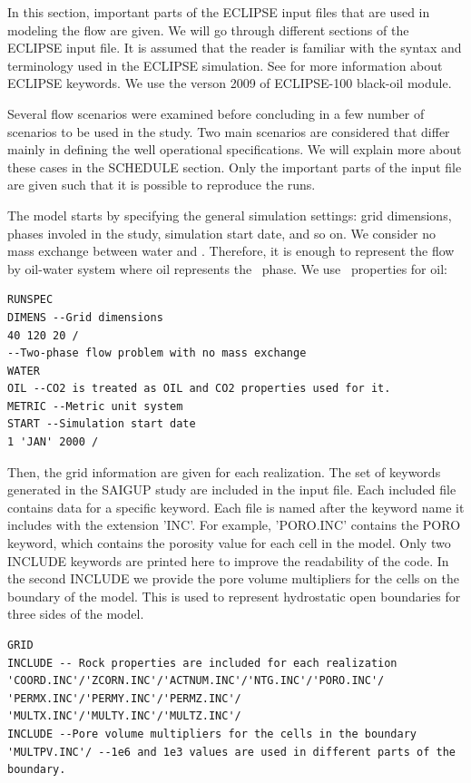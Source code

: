 In this section, important parts of the ECLIPSE input files that are used in modeling the flow are given. We will go through different sections of the ECLIPSE input file. It is assumed that the reader is familiar with the syntax and terminology used in the ECLIPSE simulation. See \cite{sis2007eclipse} for more information about ECLIPSE keywords. We use the verson 2009 of ECLIPSE-100 black-oil module.

Several flow scenarios were examined before concluding in a few number of scenarios to be used in the study. Two main scenarios are considered that differ mainly in defining the well operational specifications. We will explain more about these cases in the SCHEDULE section. Only the important parts of the input file are given such that it is possible to reproduce the runs.

The model starts by specifying the general simulation settings: grid dimensions, phases involed in the study, simulation start date, and so on. We consider no mass exchange between water and \coo. Therefore, it is enough to represent the flow by oil-water system where oil represents the \coo\ phase. We use \coo\ properties for oil:  
\begin{lstlisting}
RUNSPEC 
DIMENS --Grid dimensions
40 120 20 / 
--Two-phase flow problem with no mass exchange
WATER 
OIL --CO2 is treated as OIL and CO2 properties used for it.
METRIC --Metric unit system
START --Simulation start date 
1 'JAN' 2000 /  
\end{lstlisting}
Then, the grid information are given for each realization. The set of keywords generated in the SAIGUP study are included in the input file. Each included file contains data for a specific keyword. Each file is named after the keyword name it includes with the extension 'INC'. For example, 'PORO.INC' contains the PORO keyword, which contains the porosity value for each cell in the model. Only two INCLUDE keywords are printed  here to improve the readability of the code. In the second INCLUDE we provide the pore volume multipliers for the cells on the boundary of the model. This is used to represent hydrostatic open boundaries for three sides of the model.
\begin{lstlisting}
GRID 
INCLUDE -- Rock properties are included for each realization
'COORD.INC'/'ZCORN.INC'/'ACTNUM.INC'/'NTG.INC'/'PORO.INC'/
'PERMX.INC'/'PERMY.INC'/'PERMZ.INC'/
'MULTX.INC'/'MULTY.INC'/'MULTZ.INC'/
INCLUDE --Pore volume multipliers for the cells in the boundary
'MULTPV.INC'/ --1e6 and 1e3 values are used in different parts of the boundary.
\end{lstlisting}
